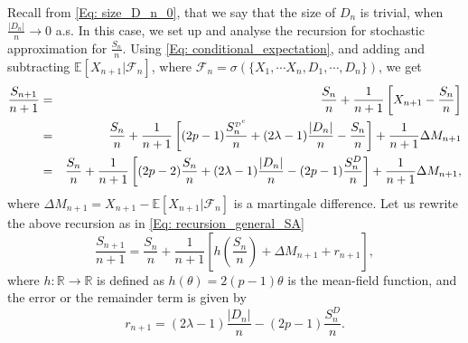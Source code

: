 \documentclass{article}
\numberwithin{equation}{section}
\newcommand{\FF}{\mbox{${\mathcal F}$}}
\newcommand{\DD}{\mbox{${\mathcal D}$}}
\newcommand{\Rbold}{\mbox{${\mathbb R}$}}
\newcommand{\1}{\mathbf{1}}
\newcommand{\0}{\mathbf{0}}
\newcommand{\E}{\mbox{${\mathbb E}$}}
\begin{document}
Recall from \eqref{Eq: size_D_n_0}, that we say that the size of $D_n$ is trivial, 
when $\frac{|D_n|}{n} \rightarrow 0$ a.s. In this case, we set up and analyse the recursion for stochastic approximation for $\frac{S_n}{n}$. Using \eqref{Eq: conditional_expectation}, and adding and subtracting $\E\left[X_{n+1} | \FF_n \right]$, where $\FF_n = \sigma(\{X_1,\cdots X_n, D_1, \cdots, D_n\})$, we get
\begin{eqnarray*} 
\frac{S_{n+1}}{n+1} &=& \frac{S_n}{n} + \frac{1}{n+1} \left [ X_{n+1} - \frac{S_n}{n} \right] \\
&=& \frac{S_n}{n} + \frac{1}{n+1} \left [(2p-1) \frac{S_n^{{\tiny \DD}^c}}{n} + (2\lambda-1) \frac{|D_n|}{n} - \frac{S_n}{n}\right] + \frac{1}{n+1} \Delta M_{n+1}\\
&=& \frac{S_n}{n} + \frac{1}{n+1} \left [(2p-2) \frac{S_n}{n} + (2\lambda-1) \frac{|D_n|}{n} - (2p-1)\frac{S_n^{D}}{n}\right] + \frac{1}{n+1} \Delta M_{n+1},
\end{eqnarray*}
where $\Delta M_{n+1} = X_{n+1} - \E[ X_{n+1} | \FF_n]$ is a martingale difference.
Let us rewrite the above recursion as in \eqref{Eq: recursion_general_SA}
\begin{equation}
\label{Eq: SA_Dn_to_zero}
\frac{S_{n+1}}{n+1}=\frac{S_n}{n} + \frac{1}{n+1} \left [h\left(\frac{S_n}{n} \right)+  \Delta M_{n+1} +r_{n+1}\right],
\end{equation}
where $h:\Rbold \rightarrow \Rbold$ is defined as $h(\theta)= 2(p-1)\theta$ is the mean-field function, and the error or the remainder term is given by 
\begin{equation}
\label{Eq: error_D_n/n_goes_to_zero}
r_{n+1}= (2\lambda-1) \frac{|D_n|}{n} - (2p-1)\frac{S_n^{D}}{n}.
\end{equation} 
\end{document}
